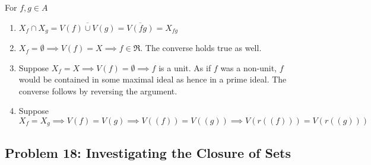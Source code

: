 \documentclass[12pt]{article}
\begin{document}
For $f,g \in A$

\begin{enumerate}
 \item $X_f \cap X_g = \overline{V(f) \cup V(g)} = \overline{V(fg)} = X_{fg}$
 \item $X_f = \emptyset \implies V(f) = X \implies f \in \mathfrak{R}$. The converse holds true as well.
 \item Suppose $X_f = X \implies V(f) = \emptyset \implies f$ is a unit. As if $f$ was a non-unit, $f$ would be contained in some maximal ideal as hence in a prime ideal. The converse follows by reversing the argument.
 \item Suppose $X_f = X_g \implies V(f) = V(g) \implies V((f)) = V((g)) \implies V(r((f))) = V(r((g)))$
\end{enumerate}



\subsection{Problem 18: Investigating the Closure of Sets}
\end{document}
